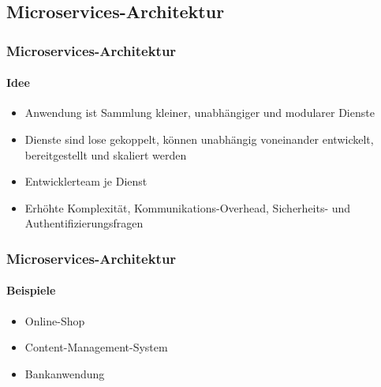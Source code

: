 \subsection{Microservices-Architektur}
\begin{frame}
  \frametitle{Microservices-Architektur}
  \framesubtitle{Idee}
  \begin{itemize}
    \item Anwendung ist Sammlung kleiner, unabhängiger und modularer Dienste 
    \item Dienste sind lose gekoppelt, können unabhängig voneinander entwickelt, bereitgestellt und skaliert werden
    \item Entwicklerteam je Dienst
    \item Erhöhte Komplexität, Kommunikations-Overhead, Sicherheits- und Authentifizierungsfragen
  \end{itemize}
\end{frame}

\begin{frame}
  \frametitle{Microservices-Architektur}
  \framesubtitle{Beispiele}
  \begin{itemize}
    \item Online-Shop
    \item Content-Management-System
    \item Bankanwendung
  \end{itemize}
\end{frame}
